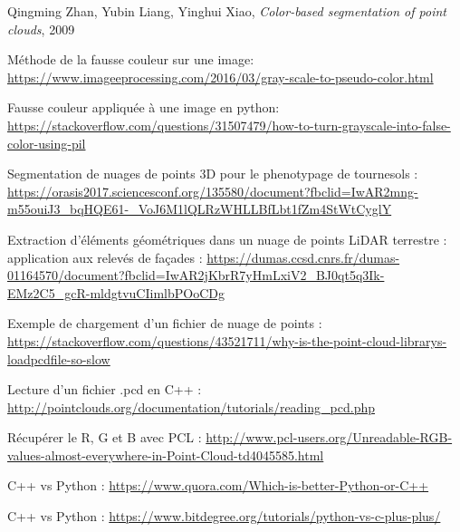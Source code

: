 \documentclass[12pt,titlepage,french]{article}
\newcounter{firstbib}
\begin{document}
\renewcommand{\refname}{Segmentation}
\begin{thebibliography}{3}
 Qingming Zhan, Yubin Liang, Yinghui Xiao, \textit{Color-based segmentation of point clouds}, 2009

\setcounter{firstbib}{\value{enumiv}}
\end{thebibliography}

\renewcommand{\refname}{Fausse couleur}
\begin{thebibliography}{3}
\setcounter{enumiv}{\value{firstbib}}


 Méthode de la fausse couleur sur une image:
\url{https://www.imageeprocessing.com/2016/03/gray-scale-to-pseudo-color.html}

 Fausse couleur appliquée à une image en python:
\url{https://stackoverflow.com/questions/31507479/how-to-turn-grayscale-into-false-color-using-pil}

\setcounter{firstbib}{\value{enumiv}}
\end{thebibliography}


\renewcommand{\refname}{C++}
\begin{thebibliography}{3}
\setcounter{enumiv}{\value{firstbib}}

 Segmentation de nuages de points 3D pour le phenotypage de tournesols :
\url{https://orasis2017.sciencesconf.org/135580/document?fbclid=IwAR2mng-m55ouiJ3_bqHQE61-_VoJ6M1lQLRzWHLLBfLbt1fZm4StWtCyglY}

 Extraction d'éléments géométriques dans un nuage de points LiDAR terrestre : application aux relevés de façades :
\url{https://dumas.ccsd.cnrs.fr/dumas-01164570/document?fbclid=IwAR2jKbrR7yHmLxiV2_BJ0qt5q3Ik-EMz2C5_gcR-mldgtvuCIimlbPOoCDg}

 Exemple de chargement d'un fichier de nuage de points :
\url{https://stackoverflow.com/questions/43521711/why-is-the-point-cloud-librarys-loadpcdfile-so-slow}

 Lecture d'un fichier .pcd en C++ :
\url{http://pointclouds.org/documentation/tutorials/reading_pcd.php}

 Récupérer le R, G et B avec PCL :
\url{http://www.pcl-users.org/Unreadable-RGB-values-almost-everywhere-in-Point-Cloud-td4045585.html}

\setcounter{firstbib}{\value{enumiv}}
\end{thebibliography}


\renewcommand{\refname}{Comparaison C++/Python}
\begin{thebibliography}{3}
\setcounter{enumiv}{\value{firstbib}}

 C++ vs Python :
\url{https://www.quora.com/Which-is-better-Python-or-C++}

 C++ vs Python :
\url{https://www.bitdegree.org/tutorials/python-vs-c-plus-plus/}

\setcounter{firstbib}{\value{enumiv}}
\end{thebibliography}
\end{document}
